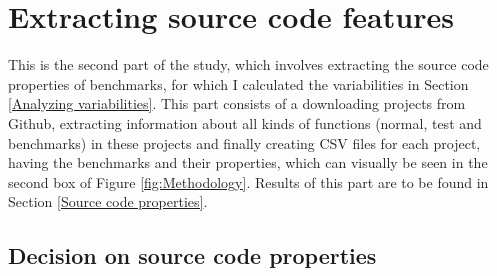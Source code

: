 \documentclass{seal_thesis}
\begin{document}
\section{Extracting source code features}

This is the second part of the study, which involves extracting the source code properties of benchmarks, for which I calculated the variabilities in Section \ref{Analyzing variabilities}. This part consists of a downloading projects from Github, extracting information about all kinds of functions (normal, test and benchmarks) in these projects and finally creating CSV files for each project, having the benchmarks and their properties, which can visually be seen in the second box of Figure \ref{fig:Methodology}. Results of this part are to be found in Section \ref{Source code properties}.

\subsection{Decision on source code properties}
\end{document}
